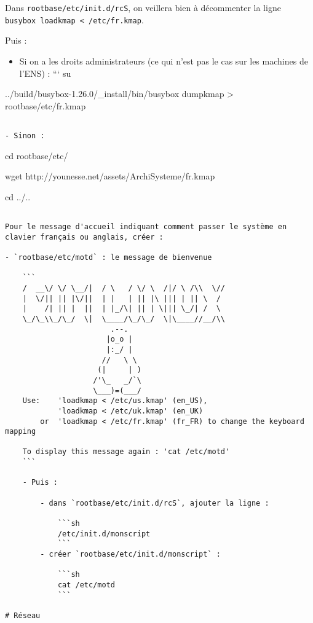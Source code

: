 \documentclass[]{article}
\providecommand{\tightlist}{%
  \setlength{\itemsep}{0pt}\setlength{\parskip}{0pt}}
\begin{document}
Dans \texttt{rootbase/etc/init.d/rcS}, on veillera bien à décommenter la
ligne \texttt{busybox\ loadkmap\ \textless{}\ /etc/fr.kmap}.

Puis :

\begin{itemize}
\tightlist
\item
  Si on a les droits administrateurs (ce qui n'est pas le cas sur les
  machines de l'ENS) : ``` su
\end{itemize}

../build/busybox-1.26.0/\_install/bin/busybox dumpkmap \textgreater{}
rootbase/etc/fr.kmap

\begin{verbatim}

- Sinon :
\end{verbatim}

cd rootbase/etc/

wget http://younesse.net/assets/ArchiSysteme/fr.kmap

cd ../..

\begin{verbatim}

Pour le message d'accueil indiquant comment passer le système en clavier français ou anglais, créer :

- `rootbase/etc/motd` : le message de bienvenue

    ```
    /  __\/ \/ \__/|  / \   / \/ \  /|/ \ /\\  \//
    |  \/|| || |\/||  | |   | || |\ ||| | || \  /
    |    /| || |  ||  | |_/\| || | \||| \_/| /  \
    \_/\_\\_/\_/  \|  \____/\_/\_/  \|\____//__/\\
                        .--.
                       |o_o |
                       |:_/ |
                      //   \ \
                     (|     | )
                    /'\_   _/`\
                    \___)=(___/  
    Use:    'loadkmap < /etc/us.kmap' (en_US),
            'loadkmap < /etc/uk.kmap' (en_UK)
        or  'loadkmap < /etc/fr.kmap' (fr_FR) to change the keyboard mapping

    To display this message again : 'cat /etc/motd'
    ```

    - Puis :

        - dans `rootbase/etc/init.d/rcS`, ajouter la ligne :

            ```sh
            /etc/init.d/monscript
            ```
        - créer `rootbase/etc/init.d/monscript` :

            ```sh
            cat /etc/motd
            ```

# Réseau
\end{verbatim}
\end{document}

